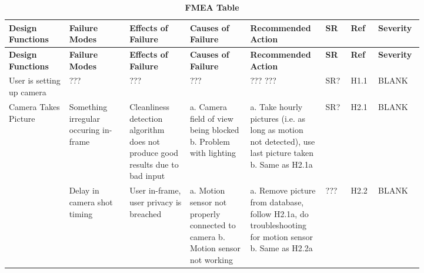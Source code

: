 \documentclass{article}
\begin{document}
\begin{longtable}{|>{\raggedright\arraybackslash}p{0.13\linewidth} | >{\raggedright\arraybackslash}p{0.13\linewidth} | >{\raggedright\arraybackslash}p{0.13\linewidth}| >{\raggedright\arraybackslash}p{0.13\linewidth}| >{\raggedright\arraybackslash}p{0.13\linewidth}| >{\raggedright\arraybackslash}p{0.05\linewidth}| >{\raggedright\arraybackslash}p{0.05\linewidth}| >{\raggedright\arraybackslash}p{0.07\linewidth}|}
    \caption{\bf FMEA Table} \label{tab:my_label} \\
    
    \hline
    \textbf{Design Functions} & \textbf{Failure Modes} & \textbf{Effects of Failure} & \textbf{Causes of Failure} & \textbf{Recommended Action} & \textbf{SR} & \textbf{Ref} & \textbf{Severity}\\
    \hline
    \endfirsthead
    
    \hline
    \textbf{Design Functions} & \textbf{Failure Modes} & \textbf{Effects of Failure} & \textbf{Causes of Failure} & \textbf{Recommended Action} & \textbf{SR} & \textbf{Ref} & \textbf{Severity}\\
    \hline
    \endhead
    
    \hline
    \endfoot
    
    \hline
    \endlastfoot
    
    User is setting up camera & ??? \newline & ???\newline & ???  \newline & ??? \newline???  \newline & SR?  \newline & H1.1  \newline & BLANK\\


    \hline
    Camera Takes Picture & Something irregular occuring in-frame \newline & Cleanliness detection algorithm does not produce good results due to bad input\newline & a. Camera field of view being blocked \newline b. Problem with lighting  \newline & a. Take hourly pictures (i.e. as long as motion not detected), use last picture taken \newline b. Same as H2.1a  \newline & SR?  \newline & H2.1  \newline & BLANK\\
    & Delay in camera shot timing & User in-frame, user privacy is breached & a. Motion sensor not properly connected to camera  \newline b. Motion sensor not working &  a. Remove picture from database, follow H2.1a, do troubleshooting for motion sensor \newline b. Same as H2.2a \newline & ??? & H2.2 & BLANK\\
    

\end{longtable}
\end{document}
